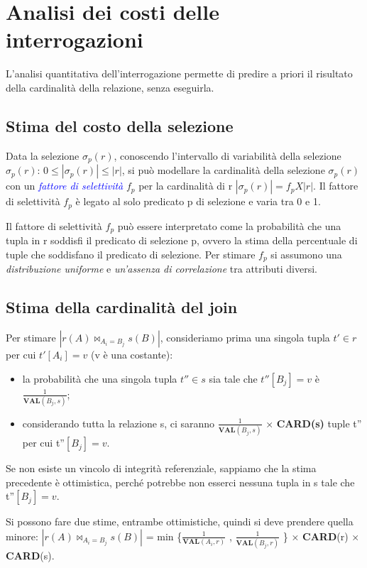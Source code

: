 \section{Analisi dei costi delle interrogazioni}

L'analisi quantitativa dell'interrogazione permette di predire a priori il risultato della cardinalità della relazione, senza eseguirla.

\subsection{Stima del costo della selezione}

Data la selezione $\sigma_p (r)$, conoscendo l’intervallo di variabilità della selezione $\sigma_p (r)$:
$0 \leq |\sigma_p (r)| \leq |r|$, si può modellare la cardinalità della selezione $\sigma_p (r)$ con un \textcolor{blue}{\textit{fattore di selettività}} $f_p$ per la cardinalità di r $|\sigma_p (r)| = f_p X |r|$.
Il fattore di selettività $f_p$ è legato al solo predicato p di selezione e varia tra 0 e 1.

Il fattore di selettività $f_p$ può essere interpretato come la probabilità che una tupla in r soddisfi il predicato di selezione p, ovvero la stima della percentuale di tuple che soddisfano il predicato di selezione. Per stimare $f_p$ si assumono una \textit{distribuzione uniforme} e \textit{un'assenza di correlazione} tra attributi diversi.

\subsection{Stima della cardinalità del join}

Per stimare $|r(A)\bowtie_{A_i = B_j} s(B)|$, consideriamo prima una singola tupla
$t' \in r$ per cui $t'[A_i]=v$ (v è una costante):
\begin{itemize}
    \item la probabilità che una singola tupla $t'' \in s$ sia tale che $t''[B_j]=v$ è $\frac{1}{\textbf{VAL}(B_j, s)}$;
    \item considerando tutta la relazione s, ci saranno $\frac{1}{\textbf{VAL}(B_j, s)}$ × \textbf{CARD(s)} tuple t'' per cui t''$[B_j]=v$.
\end{itemize}

Se non esiste un vincolo di integrità referenziale, sappiamo che la stima precedente è ottimistica, perché potrebbe non esserci nessuna tupla in s tale che t''$[B_j]=v$.

Si possono fare due stime, entrambe ottimistiche, quindi si deve prendere quella minore: $|r(A) \bowtie_{A_i=B_j} s(B)|$ = min \{$\frac{1}{\textbf{VAL}(A_i, r)}$ , $\frac{1}{\textbf{VAL}(B_j, r)}$ \} × \textbf{CARD}(r) × \textbf{CARD}(s).

